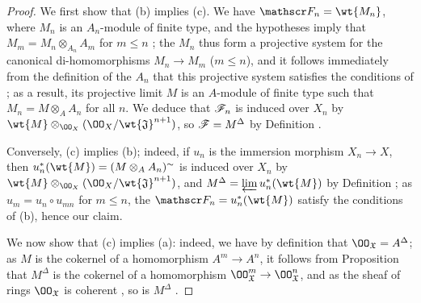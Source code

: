 \begin{proof}
\label{proof-1.10.10.5}
We first show that (b) implies (c).
We have $\sh{F}_n=\wt{M_n}$, where $M_n$ is an $A_n$-module of finite type, and the hypotheses imply that $M_m=M_n\otimes_{A_n}A_m$ for $m\leq n$ ; the $M_n$ thus form a projective system for the canonical di-homomorphisms $M_n\to M_m$ ($m\leq n$), and it follows immediately from the definition of the $A_n$ that this projective system satisfies the conditions of ; as a result, its projective limit $M$ is an $A$-module of finite type such that $M_n=M\otimes_A A_n$ for all $n$.
We deduce that $\mathscr{F}_n$ is induced over $X_n$ by $\wt{M}\otimes_{\OO_X}(\OO_X/\wt{\mathfrak{J}}^{n+1})$, so $\mathscr{F}=M^\Delta$ by Definition .

Conversely, (c) implies (b); indeed, if $u_n$ is the immersion morphism $X_n\to X$, then $u_n^*(\wt{M})=(M\otimes_A A_n)^\sim$ is induced over $X_n$ by $\wt{M}\otimes_{\OO_X}(\OO_X/\wt{\mathfrak{J}}^{n+1})$, and $M^\Delta=\varprojlim u_n^*(\wt{M})$ by Definition ; as $u_m=u_n\circ u_{mn}$ for $m\leq n$, the $\sh{F}_n=u_n^*(\wt{M})$ satisfy the conditions of (b), hence our claim.

We now show that (c) implies (a): indeed, we have by definition that $\OO_\mathfrak{X}=A^\Delta$; as $M$ is the cokernel of a homomorphism $A^m\to A^n$, it follows from Proposition  that $M^\Delta$ is the cokernel of a homomorphism $\OO_\mathfrak{X}^m\to\OO_\mathfrak{X}^n$, and as the sheaf of rings $\OO_\mathfrak{X}$ is coherent , so is $M^\Delta$ .


\end{proof}
